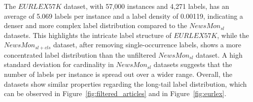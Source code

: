 The $EURLEX57K$ dataset, with 57,000 instances and 4,271 labels, has an average of 5.069 labels per instance and a label density of 0.00119, indicating a denser and more complex label distribution compared to the $NewsMon_{sl}$ datasets. 
This highlights the intricate label structure of $EURLEX57K$, while the $NewsMon_{sl+cls}$ dataset, after removing single-occurrence labels, shows a more concentrated label distribution than the unfiltered $NewsMon_{sl}$ dataset. 
A high standard deviation for cardinality in $NewsMon_{sl}$ datasets suggests that the number of labels per instance is spread out over a wider range.
Overall, the datasets show similar properties regarding the long-tail label distribution, which can be observed in Figure~\ref{fig:filtered_articles} and in Figure~\ref{fig:eurlex}.
